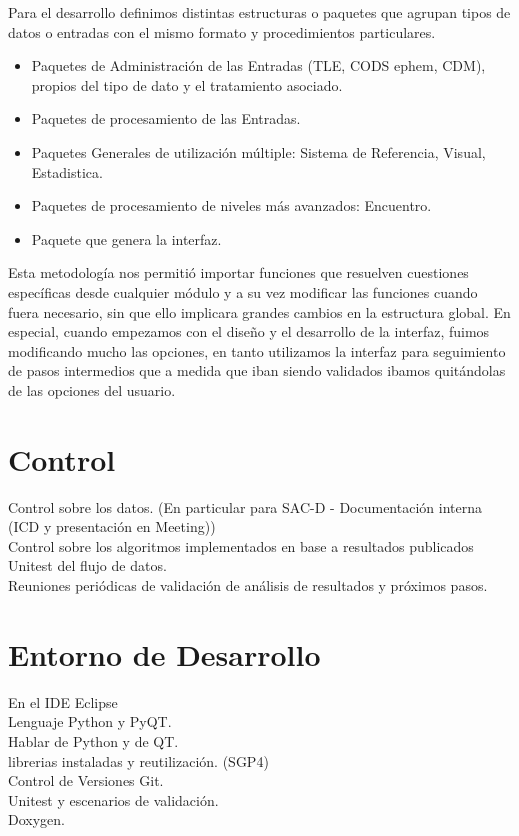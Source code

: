 Para el desarrollo definimos distintas estructuras o paquetes que agrupan tipos de datos o entradas con el mismo formato y procedimientos particulares.\\
\begin{itemize}
 \item Paquetes de Administraci\'on de las Entradas (TLE, CODS ephem, CDM), propios del tipo de dato y el tratamiento asociado.
 \item Paquetes de procesamiento de las Entradas.
 \item Paquetes Generales de utilizaci\'on m\'ultiple: Sistema de Referencia, Visual, Estadistica.
 \item Paquetes de procesamiento de niveles m\'as avanzados: Encuentro. 
 \item Paquete que genera la interfaz.
\end{itemize}

Esta metodolog\'ia nos permiti\'o importar funciones que resuelven cuestiones espec\'ificas desde cualquier  m\'odulo y a su vez modificar las funciones cuando fuera necesario, sin que ello implicara grandes cambios en la estructura global. En especial, cuando empezamos con el diseño y el desarrollo de la interfaz, fuimos modificando mucho las opciones, en tanto utilizamos la interfaz para seguimiento de pasos intermedios que a medida que iban siendo validados ibamos quit\'andolas de las opciones del usuario.\\

\section{Control}
Control sobre los datos. (En particular para SAC-D - Documentaci\'on interna (ICD y presentaci\'on en Meeting))\\
Control sobre los algoritmos implementados en base a resultados publicados\\
Unitest del flujo de datos.\\
Reuniones peri\'odicas de validaci\'on de an\'alisis de resultados y pr\'oximos pasos.\\



\section{Entorno de Desarrollo}
En el IDE Eclipse\\
Lenguaje Python y PyQT.\\
Hablar de Python y de QT.\\
librerias instaladas y reutilizaci\'on. (SGP4)\\
Control de Versiones Git.\\
Unitest y escenarios de validaci\'on.\\
Doxygen.\\


